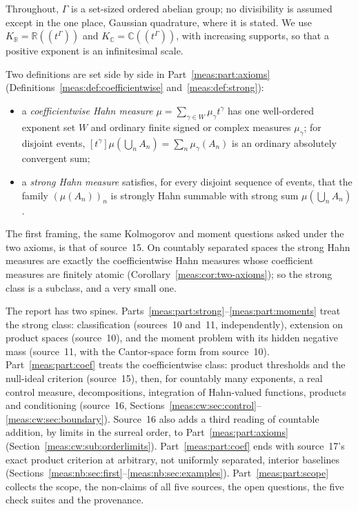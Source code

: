 \documentclass[11pt]{article}
\numberwithin{equation}{section}
\theoremstyle{definition}
\theoremstyle{remark}
\newcommand{\R}{\mathbb R}
\newcommand{\C}{\mathbb C}
\newcommand{\KR}{K_{\R}}
\newcommand{\KC}{K_{\C}}
\newcommand{\coef}[2]{[t^{#1}]#2}
\begin{document}
Throughout, $\Gamma$ is a set-sized ordered abelian group; no divisibility is
assumed except in the one place, Gaussian quadrature, where it is stated. We
use $\KR=\R((t^\Gamma))$ and $\KC=\C((t^\Gamma))$, with increasing supports, so
that a positive exponent is an infinitesimal scale.

Two definitions are set side by side in Part~\ref{meas:part:axioms}
(Definitions~\ref{meas:def:coefficientwise} and~\ref{meas:def:strong}):
\begin{itemize}
\item a \emph{coefficientwise Hahn measure}
$\mu=\sum_{\gamma\in W}\mu_\gamma t^\gamma$ has one well-ordered exponent set
$W$ and ordinary finite signed or complex measures $\mu_\gamma$; for disjoint
events, $\coef{\gamma}{\mu(\bigcup_nA_n)}=\sum_n\mu_\gamma(A_n)$ is an ordinary
absolutely convergent sum;
\item a \emph{strong Hahn measure} satisfies, for every disjoint sequence of
events, that the family $(\mu(A_n))_n$ is strongly Hahn summable with strong
sum $\mu(\bigcup_nA_n)$.
\end{itemize}
The first framing, the same Kolmogorov and moment questions asked under the
two axioms, is that of source~15. On countably separated spaces the strong
Hahn measures are exactly the coefficientwise Hahn measures whose coefficient
measures are finitely atomic (Corollary~\ref{meas:cor:two-axioms}); so the
strong class is a subclass, and a very small one.

The report has two spines. Parts~\ref{meas:part:strong}--\ref{meas:part:moments}
treat the strong class: classification (sources~10 and~11, independently),
extension on product spaces (source~10), and the moment problem with its hidden
negative mass (source~11, with the Cantor-space form from source~10).
Part~\ref{meas:part:coef} treats the coefficientwise class: product
thresholds and the null-ideal criterion (source~15), then, for countably many
exponents, a real control measure, decompositions, integration of Hahn-valued
functions, products and conditioning (source~16,
Sections~\ref{meas:cw:sec:control}--\ref{meas:cw:sec:boundary}). Source~16 also
adds a third reading of countable addition, by limits in the surreal order, to
Part~\ref{meas:part:axioms} (Section~\ref{meas:cw:sub:orderlimits}). Part~\ref{meas:part:coef}
ends with source~17's exact product criterion at arbitrary, not uniformly
separated, interior baselines
(Sections~\ref{meas:nb:sec:first}--\ref{meas:nb:sec:examples}).
Part~\ref{meas:part:scope} collects the scope, the non-claims of all five
sources, the open questions, the five check suites and the provenance.
\end{document}
